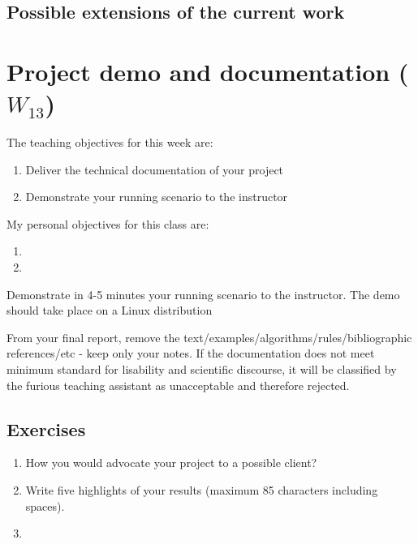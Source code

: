 \documentclass[a4paper,12pt]{report}
\begin{document}
\section{Possible extensions of the current work}






\chapter{Project demo and documentation ($W_{13}$)}

The teaching objectives for this week are:
\begin{enumerate}
\item Deliver the technical documentation of your project
\item Demonstrate your running scenario to the instructor
\end{enumerate}

\vspace{0.5cm}

My personal objectives for this class are:
\begin{enumerate}
 \item 
 \item 
\end{enumerate}


Demonstrate in 4-5 minutes your running scenario to the instructor. 
The demo should take place on a Linux distribution


From your final report, remove the text/examples/algorithms/rules/bibliographic references/etc - keep only your notes. 
If the documentation does not meet minimum standard for lisability and scientific discourse, 
it will be classified by the furious teaching assistant as unacceptable and therefore rejected.




\section{Exercises}
\begin{enumerate}
 \item How you would advocate your project to a possible client?
 \item Write five highlights of your results (maximum 85 characters including spaces).
 \item 
\end{enumerate}

\vspace{0.5cm}
\end{document}
